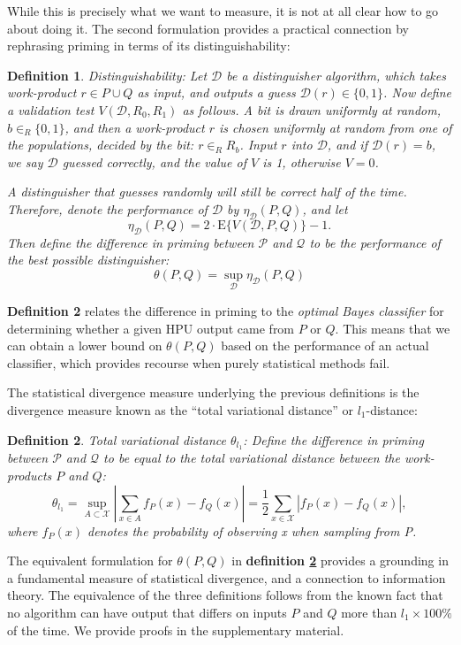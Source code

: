 \documentclass[12pt]{article}
\newtheorem{mydef}{Definition}
\begin{document}
While this is precisely what we want to measure, it is not at all clear how
to go about doing it.  The second formulation provides a practical connection
by rephrasing priming in terms of its distinguishability:

\begin{mydef}
	{\upshape Distinguishability:}
	Let $\mathcal{D}$ be a distinguisher algorithm, which takes work-product 
	$r \in P \cup Q$ as input, and outputs a \emph{guess} 
	$\mathcal{D}(r) \in \{0, 1\}$. Now define a validation test 
	$V(\mathcal{D}, R_0, R_1)$ as follows. A bit is drawn uniformly at random, 
	$b \in_R \{0, 1\}$, and then a work-product $r$ is chosen uniformly at 
	random from one of the populations, decided by the bit: $r \in_R R_b$. 
	Input $r$ into $\mathcal{D}$, and if $\mathcal{D}(r) = b$, we say 
	$\mathcal{D}$ \emph{guessed correctly}, and the value of $V$ is 1, 
	otherwise $V = 0$.

	A distinguisher that guesses randomly will still be correct half of the 
	time. Therefore, denote the performance of $\mathcal{D}$ by 
	$\eta_\mathcal{D}(P, Q)$, and let
	$$
		\eta_\mathcal{D}(P,Q) = 2\cdot \mathrm{E}\{V(\mathcal{D},P,Q)\} - 1.
	$$
	Then define the difference in priming between $\mathcal{P}$ and 
	$\mathcal{Q}$ to be the performance of the best possible distinguisher:
	$$ 
		\theta(P,Q) = \sup_\mathcal{D} \eta_\mathcal{D}(P,Q)
	$$
	\label{def:dist}
\end{mydef}

\textbf{Definition 2} relates the difference in priming to the 
\textit{optimal Bayes classifier} for determining whether a given HPU output
came from $P$ or $Q$.  This means that we can obtain a lower bound on
$\theta(P,Q)$ based on the performance of an actual classifier, which provides
recourse when purely statistical methods fail.

The statistical divergence measure underlying the previous definitions is the
divergence measure known as the ``total variational distance'' or 
$l_1$-distance:
\begin{mydef}
	\label{def:l1}
	{\upshape Total variational distance $\theta_{l_1}$:}
	Define the difference in priming between $\mathcal{P}$ and $\mathcal{Q}$ 
	to be equal to the total variational distance between the work-products 
	$P$ and $Q$:
	$$
	\theta_{l_1}
	= \sup_{A \subset \mathcal{X}} \left| \sum_{x \in A} f_P(x) - f_Q(x)\right|
	= \frac{1}{2} \sum_{x \in \mathcal{X}} \left| f_P(x) - f_Q(x) \right|,
	$$
	where $f_P(x)$ denotes the probability of observing x when sampling from P.
\end{mydef}
The equivalent formulation for $\theta(P,Q)$ in 
\textbf{definition \ref{def:l1}} provides a grounding in a fundamental
measure of statistical divergence, and a connection to information theory.  
The equivalence of the three definitions
follows from the known fact that no algorithm can have output that differs
on inputs $P$ and $Q$ more than $l_1 \times 100\%$ of the time.  We provide
proofs in the supplementary material.
\end{document}
